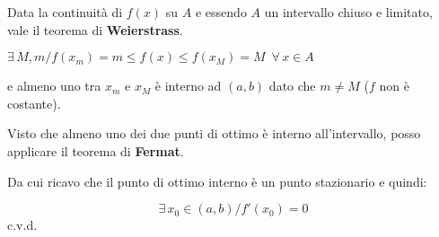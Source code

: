 \documentclass[../dimostrazioni]{subfiles}
\begin{document}
            Data la continuità di \(f(x)\) su \(A\) e essendo \(A\) un intervallo chiuso e limitato,\\ 
            vale il teorema di \textbf{Weierstrass}.
            
            \( \exists \, M, m / f(x_m)=m \leqslant f(x) \leqslant f(x_M) = M \, \, \, \forall \, x \in A \)

            e almeno uno tra \(x_m\) e \(x_M\) è interno ad \( (a,b) \) dato che \( m \neq M \) (\( f \) non è costante).

            Visto che almeno uno dei due punti di ottimo è interno all'intervallo, posso applicare il teorema di \textbf{Fermat}.
            
            Da cui ricavo che il punto di ottimo interno è un punto stazionario e quindi:

            \[\exists \, x_0 \in (a,b) / f'(x_0) = 0 \] c.v.d.

    
\end{document}
